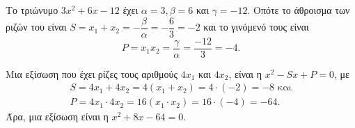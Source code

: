 
\begin{alist}
\item Το τριώνυμο $3x^2 + 6x - 12$ έχει $\alpha = 3, \beta = 6$ και $\gamma = -12$. Οπότε το άθροισμα των
ριζών του είναι $S = x_1 + x_2 = -\dfrac{\beta}{\alpha} = -\dfrac{6}{3} = -2$ και το γινόμενό τους είναι
\[P = x_1 x_2 = \dfrac{\gamma}{\alpha} = \dfrac{-12}{3} = -4.\]

\item Μια εξίσωση που έχει ρίζες τους αριθμούς $4x_1$ και $4x_2$, είναι η $x^2 - Sx + P = 0$, με
\begin{gather*}
S = 4x_1 + 4x_2 = 4(x_1 + x_2) = 4 \cdot (-2) = -8\text{ και} \\
P = 4x_1 \cdot 4x_2 = 16(x_1 \cdot x_2) = 16 \cdot (-4) = -64.
\end{gather*}
Άρα, μια εξίσωση είναι η $x^2 + 8x - 64 = 0$.
\end{alist}

